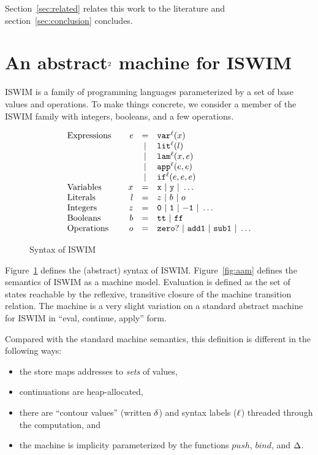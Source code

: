 \documentclass[preprint,onecolumn,9pt]{sigplanconf} %
\begin{document}
Section~\ref{sec:related} relates this work to the literature and
section~\ref{sec:conclusion} concludes.



\section{An abstract$^{\text 2}$ machine for ISWIM}
\label{sec:aam}


ISWIM is a family of programming languages parameterized by a set of
base values and operations.  To make things concrete, we consider a
member of the ISWIM family with integers, booleans, and a few
operations.

\begin{figure}
\[
\begin{array}{l@{\qquad}rcl}
\text{Expressions} & \mathit{e} &=& \svar[^\mlab]\mvar\\
&&|& \slit[^\mlab]\mlit\\
&&|& \slam[^\mlab]\mvar\mexp\\
&&|& \sapp[^\mlab]\mexp\mexp \\
&&|& \sif[^\mlab]\mexp\mexp\mexp \\
\text{Variables}&\mvar &=& \syntax{x}\ |\ \syntax{y}\ |\ \dots\\
\text{Literals}&\mlit &=& \mnum\ |\ \mbln\ |\ \mop\\
\text{Integers}&\mnum &=& \syntax{0}\ |\ \syntax{1}\ |\ \syntax{-1}\ |\ \dots\\
\text{Booleans}&\mbln &=& \strue\ |\ \sfalse\\
\text{Operations}&\mop &=& \syntax{zero?}\ |\ \syntax{add1}\ |\ \syntax{sub1}\ |\ \dots
\end{array}
\]
\caption{Syntax of ISWIM}
\label{fig:syntax}
\end{figure}

Figure~\ref{fig:syntax} defines the (abstract) syntax of ISWIM.
Figure~\ref{fig:aam} defines the semantics of ISWIM as a machine
model.  Evaluation is defined as the set of states reachable by the
reflexive, transitive closure of the machine transition relation.  The
machine is a very slight variation on a standard abstract machine for
ISWIM in ``eval, continue, apply'' form.

Compared with the standard machine semantics, this definition is
different in the following ways:
\begin{itemize}
\item the store maps addresses to \emph{sets} of values,
\item continuations are heap-allocated,
\item there are ``contour values'' (written ${\delta}$) and syntax
  labels (${\ell}$) threaded through the computation, and
\item the machine is implicity parameterized by the functions
  $\mathit{push}$, $\mathit{bind}$, and $\Delta$.
\end{itemize}
\end{document}
